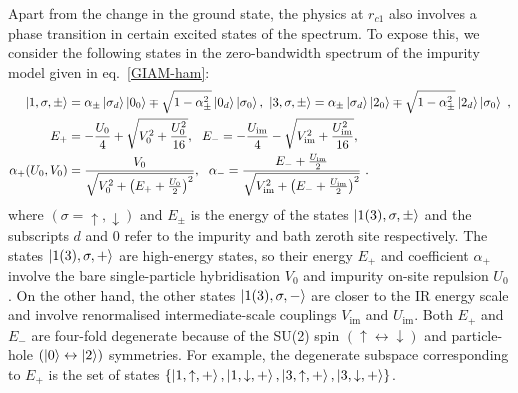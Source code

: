 \documentclass{iopart}
\begin{document}
Apart from the change in the ground state, the physics at \(r_{c1}\) also involves a phase transition in certain excited states of the spectrum. To expose this, we consider the following states in the zero-bandwidth spectrum of the impurity model given in eq.~\eqref{GIAM-ham}:
\begin{equation}\begin{aligned}
	\label{esqpt-1}
	\ket{1,\sigma,\pm} &= \alpha_\pm \ket{\sigma_d}\ket{0_0} \mp \sqrt{1 - \alpha_\pm^2}\ket{0_d}\ket{\sigma_0}, ~\ket{3,\sigma,\pm} = \alpha_\pm \ket{\sigma_d}\ket{2_0} \mp \sqrt{1 - \alpha_\pm^2}\ket{2_d}\ket{\sigma_0} ~,\\
	E_+ &= -\frac{U_0}{4} + \sqrt{V_0^2 + \frac{U_0^2}{16}}, ~~E_- = -\frac{U_\text{im}}{4} - \sqrt{V_{\text{im}}^2 + \frac{U_{\text{im}}^2}{16}},\\
	\alpha_+(U_0,V_0) &= \frac{V_0}{\sqrt{V_0^2 + \left(E_+ + \frac{U_0}{2}\right)^2 }}, ~ ~\alpha_- = \frac{E_- + \frac{U_\text{im}}{2}}{\sqrt{V_\text{im}^2 + \left(E_- + \frac{U_\text{im}}{2}\right)^2 }}~.
\end{aligned}\end{equation}
where \(\left(\sigma=\uparrow,\downarrow\right)\) and \(E_\pm\) is the energy of the states \(\ket{1(3),\sigma,\pm}\) and the subscripts $d$ and $0$ refer to the impurity and bath zeroth site respectively. The states \(\ket{1(3),\sigma,+}\) are high-energy states, so their energy \(E_+\) and coefficient \(\alpha_+\) involve the bare single-particle hybridisation \(V_0\) and impurity on-site repulsion $U_{0}$. On the other hand, the other states \(\ket{1(3),\sigma,-}\) are closer to the IR energy scale and involve renormalised intermediate-scale couplings \(V_\text{im}\) and $U_{\text{im}}$. 
Both \(E_+\) and \(E_-\) are four-fold degenerate because of the SU(2) spin \((\uparrow \leftrightarrow \downarrow)\) and particle-hole \((\ket{0} \leftrightarrow \ket{2})\) symmetries. For example, the degenerate subspace corresponding to \(E_+\) is the set of states \(\left\{\ket{1,\uparrow,+}, \ket{1,\downarrow,+}, \ket{3,\uparrow,+}, \ket{3,\downarrow,+}\right\}\). 
\end{document}
